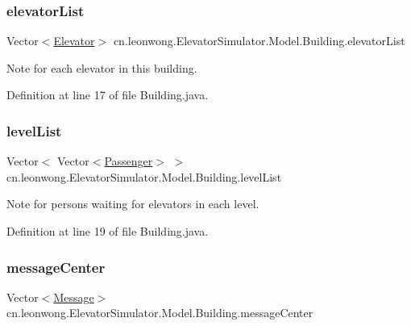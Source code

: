\subsubsection{\texorpdfstring{elevator\+List}{elevatorList}}
{\footnotesize\ttfamily Vector$<$\hyperlink{classcn_1_1leonwong_1_1_elevator_simulator_1_1_model_1_1_elevator}{Elevator}$>$ cn.\+leonwong.\+Elevator\+Simulator.\+Model.\+Building.\+elevator\+List}



Note for each elevator in this building. 



Definition at line 17 of file Building.\+java.

\mbox{\label{classcn_1_1leonwong_1_1_elevator_simulator_1_1_model_1_1_building_ae720233ad2086c6f427facb19df4fb33}} 
\subsubsection{\texorpdfstring{level\+List}{levelList}}
{\footnotesize\ttfamily Vector$<$ Vector$<$\hyperlink{classcn_1_1leonwong_1_1_elevator_simulator_1_1_model_1_1_passenger}{Passenger}$>$ $>$ cn.\+leonwong.\+Elevator\+Simulator.\+Model.\+Building.\+level\+List}



Note for persons waiting for elevators in each level. 



Definition at line 19 of file Building.\+java.

\mbox{\label{classcn_1_1leonwong_1_1_elevator_simulator_1_1_model_1_1_building_a01f6bba8a7c8f2a26a34f7ee8c055275}} 
\subsubsection{\texorpdfstring{message\+Center}{messageCenter}}
{\footnotesize\ttfamily Vector$<$\hyperlink{classcn_1_1leonwong_1_1_elevator_simulator_1_1_model_1_1_message}{Message}$>$ cn.\+leonwong.\+Elevator\+Simulator.\+Model.\+Building.\+message\+Center}



